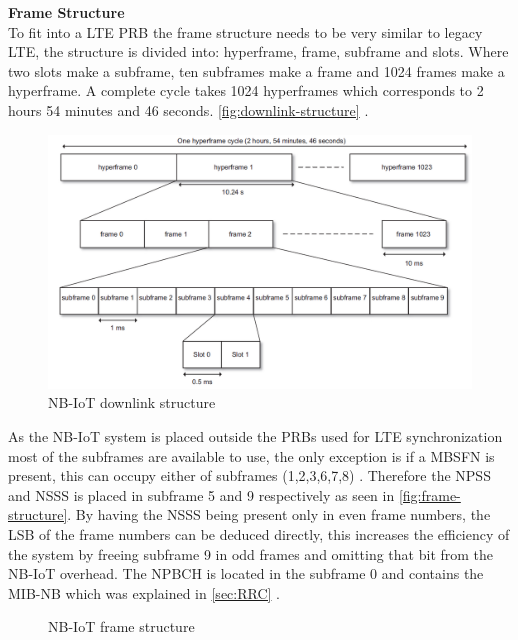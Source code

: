 \textbf{Frame Structure}\\

To fit into a \gls{LTE} \gls{PRB} the frame structure needs to be very similar to legacy \gls{LTE}, the structure is divided into: hyperframe, frame, subframe and slots. Where two slots make a subframe, ten subframes make a frame and 1024 frames make a hyperframe. A complete cycle takes 1024 hyperframes which corresponds to 2 hours 54 minutes and 46 seconds.  \autoref{fig:downlink-structure} \citep[ch. 7.2]{NB-IoT_Book}. 


\begin{figure}[H]
\centering
\includegraphics[width=\textwidth]{figures/downlink_structure_15kHz.png}
\caption{\gls{NB-IoT} downlink structure \citep[Fig. 7.7]{NB-IoT_Book}}
\label{fig:downlink-structure}
\end{figure}


As the \gls{NB-IoT} system is placed outside the \gls{PRB}s used for LTE synchronization most of the subframes are available to use, the only exception is if a \gls{MBSFN} is present, this can occupy either of subframes (1,2,3,6,7,8) \citep{LTE-MBSFN}. Therefore the \gls{NPSS} and \gls{NSSS} is placed in subframe 5 and 9 respectively as seen in \autoref{fig:frame-structure}. By having the \gls{NSSS} being present only in even frame numbers, the \gls{LSB} of the frame numbers can be deduced directly, this increases the efficiency of the system by freeing subframe 9 in odd frames and omitting that bit from the \gls{NB-IoT} overhead. The \gls{NPBCH} is located in the subframe 0 and contains the \gls{MIB-NB} which was explained in \autoref{sec:RRC} \citep{REL-13}.  


\begin{figure}[H]
\centering

\caption{\gls{NB-IoT} frame structure \citep{REL-13}}
\label{fig:frame-structure}
\end{figure}


